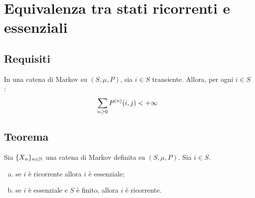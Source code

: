\section{Equivalenza tra stati ricorrenti e essenziali}


\subsection{Requisiti}
\begin{prop}\label{prop:sumtrans}
	In una catena di Markov su $(S,\mu,P)$, sia $i\in S$ transiente. Allora, per ogni $i\in S$:
	\begin{equation*}
		\sum_{n\ge0}P^{(n)}(i,j)<+\infty
	\end{equation*}
\end{prop}


\subsection{Teorema}
\begin{thm}
	Sia $\{X_n\}_{n\in\mathbb N}$ una catena di Markov definita su $(S,\mu,P)$. Sia $i\in S$.
	\begin{enumerate}[(a)]
		\item \label{elem:ricess1} se $i$ è ricorrente allora $i$ è essenziale;
		\item \label{elem:ricess2} se $i$ è essenziale e $S$ è finito, allora $i$ è ricorrente.
	\end{enumerate}
\end{thm}
